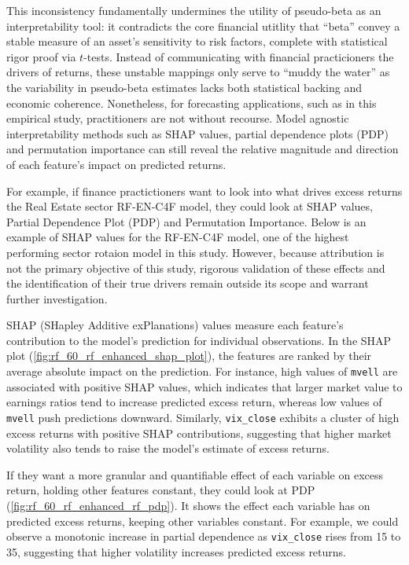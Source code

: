 This inconsistency fundamentally undermines the utility of pseudo-beta as an interpretability tool: it contradicts the core financial utitlity that “beta” convey a stable measure of an asset's sensitivity to risk factors, complete with statistical rigor proof via $t$-tests. Instead of communicating with financial practicioners the drivers of returns, these unstable mappings only serve to “muddy the water” as the variability in pseudo-beta estimates lacks both statistical backing and economic coherence. Nonetheless, for forecasting applications, such as in this empirical study, practitioners are not without recourse. Model agnostic interpretability methods such as SHAP values, partial dependence plots (PDP) and permutation importance can still reveal the relative magnitude and direction of each feature's impact on predicted returns.

For example, if finance practictioners want to look into what drives excess returns the Real Estate sector RF-EN-C4F model, they could look at SHAP values, Partial Dependence Plot (PDP) and Permutation Importance. Below is an example of SHAP values for the RF-EN-C4F model, one of the highest performing sector rotaion model in this study. However, because attribution is not the primary objective of this study, rigorous validation of these effects and the identification of their true drivers remain outside its scope and warrant further investigation.

SHAP (SHapley Additive exPlanations) values measure each feature's contribution to the model's prediction for individual observations. In the SHAP plot (\cref{fig:rf_60_rf_enhanced_shap_plot}), the features are ranked by their average absolute impact on the prediction. For instance, high values of \texttt{mvell} are associated with positive SHAP values, which indicates that larger market value to earnings ratios tend to increase predicted excess return, whereas low values of \texttt{mvell} push predictions downward. Similarly, \texttt{vix\_close} exhibits a cluster of high excess returns with positive SHAP contributions, suggesting that higher market volatility also tends to raise the model's estimate of excess returns.

If they want a more granular and quantifiable effect of each variable on excess return, holding other features constant, they could look at PDP (\cref{fig:rf_60_rf_enhanced_rf_pdp}). It shows the effect each variable has on predicted excess returns, keeping other variables constant. For example, we could observe a monotonic increase in partial dependence as \texttt{vix\_close} rises from 15 to 35, suggesting that higher volatility increases predicted excess returns.


